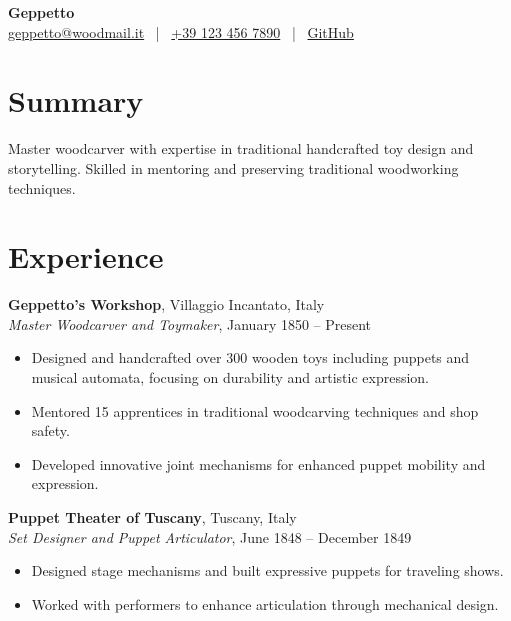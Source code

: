\documentclass[10pt]{article}
\begin{document}
\begin{center}
    {\Large\bfseries{Geppetto}}\\[0.2em]
    {\normalsize
        \href{mailto:geppetto@woodmail.it}{geppetto@woodmail.it} ~|~
        \href{tel:+39 123 456 7890}{+39 123 456 7890} ~|~
        \href{https://github.com/geppetto-works}{GitHub}
    }
\end{center}

\vspace{0.5em}


\section*{Summary}

Master woodcarver with expertise in traditional handcrafted toy design and storytelling. Skilled in mentoring and preserving traditional woodworking techniques.



\section*{Experience}

\textbf{Geppetto's Workshop}, \hfill Villaggio Incantato, Italy \\
\textit{Master Woodcarver and Toymaker}, \hfill January 1850 -- Present
\begin{itemize}[leftmargin=*, noitemsep, topsep=0.1em]

    \item Designed and handcrafted over 300 wooden toys including puppets and musical automata, focusing on durability and artistic expression.

    \item Mentored 15 apprentices in traditional woodcarving techniques and shop safety.

    \item Developed innovative joint mechanisms for enhanced puppet mobility and expression.

\end{itemize}
\vspace{0.3em}

\textbf{Puppet Theater of Tuscany}, \hfill Tuscany, Italy \\
\textit{Set Designer and Puppet Articulator}, \hfill June 1848 -- December 1849
\begin{itemize}[leftmargin=*, noitemsep, topsep=0.1em]

    \item Designed stage mechanisms and built expressive puppets for traveling shows.

    \item Worked with performers to enhance articulation through mechanical design.

\end{itemize}
\vspace{0.3em}
\end{document}
